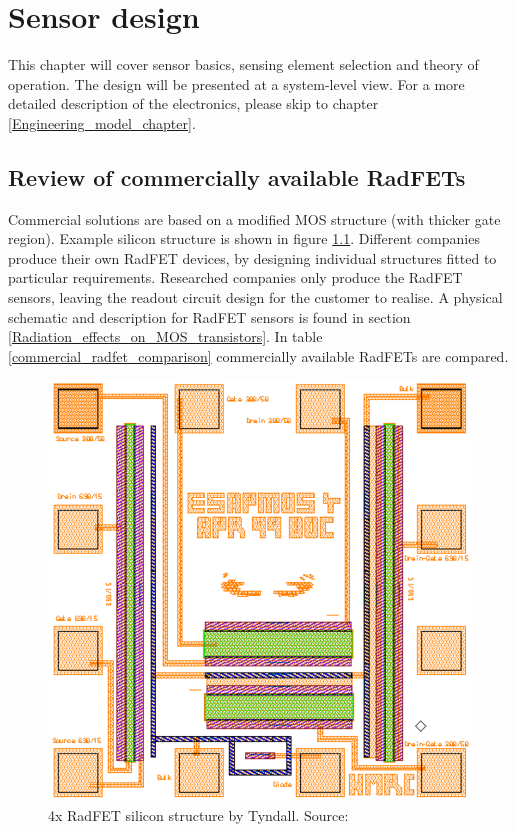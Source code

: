\chapter{Sensor design}
This chapter will cover sensor basics, sensing element selection and theory of operation. The design will be presented at a system-level view. For a more detailed description of the electronics, please skip to chapter \ref{Engineering_model_chapter}.

\section{Review of commercially available RadFETs}
    Commercial solutions are based on a modified MOS structure (with thicker gate region). Example silicon structure is shown in figure \ref{Tyndall_radfet_silicon}. Different companies produce their own RadFET devices, by designing individual structures fitted to particular requirements. Researched companies only produce the RadFET sensors, leaving the readout circuit design for the customer to realise. A physical schematic and description for RadFET sensors is found in section \ref{Radiation_effects_on_MOS_transistors}. In table \ref{commercial_radfet_comparison} commercially available RadFETs are compared.

    \begin{figure}[H]
        \centering
        \includegraphics[width=0.5\paperwidth]{img/05/radfet-silicon.eps}
        \caption{4x RadFET silicon structure by Tyndall. Source: \cite{Tyndall_Radfet}}
        \label{Tyndall_radfet_silicon}
    \end{figure}

